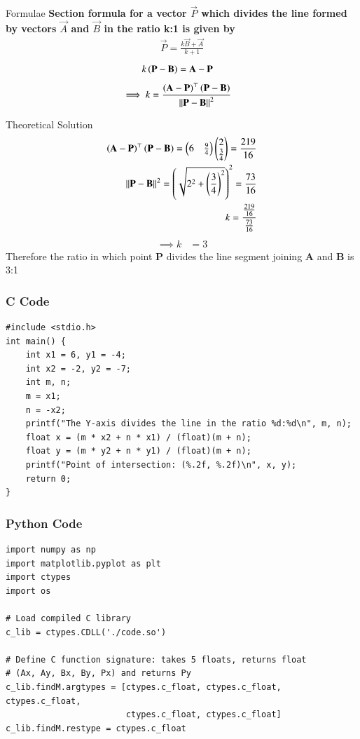 \documentclass{beamer}
\begin{document}
 \begin{frame}{Formulae}
\textbf{Section formula for a vector $\vec{P}$ which divides the line formed by vectors $\vec{A}$ and $\vec{B}$ in the ratio k:1 is given by}
\begin{align}
    \vec{P}=\frac{k\vec{B}+\vec{A}}{k+1}
\end{align}
\begin{align}
			k\left(\mathbf{P}-\mathbf{B}\right)&= \mathbf{A}-\mathbf{P}
\end{align}
\begin{align}\implies k &=
			\frac{\left(\mathbf{A}-\mathbf{P}\right)^{\top}\left(\mathbf{P}-\mathbf{B}\right)}{\left\lVert\mathbf{P}-\mathbf{B}\right\rVert^2}
			\label{eq:section_formula-k}
\end{align}
\end{frame}

\begin{frame}{Theoretical Solution}
\begin{align}
\left(\mathbf{A}-\mathbf{P}\right)^{\top}\left(\mathbf{P}-\mathbf{B}\right) =\begin{pmatrix}6 & \frac{9}{4}\end{pmatrix}\begin{pmatrix}2\\ \frac{3}{4}
\end{pmatrix}=\frac{219}{16}\\
{\left\lVert\mathbf{P}-\mathbf{B}\right\rVert^2} = \left(\sqrt{2^2 + {\left(\frac{3}{4}\right)}^2}\right)^2 = \frac{73}{16}\\
k=\frac{\frac{219}{16}}{\frac{73}{16}}
\end{align}
 \begin{align}
\implies k &= 3
\end{align}
 Therefore the ratio in which point \textbf{P} divides the line segment joining \textbf{A} and \textbf{B} is 3:1
\end{frame}

\begin{frame}[fragile]
    \frametitle{C Code }

    \begin{lstlisting}
#include <stdio.h>
int main() { 
    int x1 = 6, y1 = -4;
    int x2 = -2, y2 = -7;
    int m, n;  
    m = x1;      
    n = -x2;     
    printf("The Y-axis divides the line in the ratio %d:%d\n", m, n);
    float x = (m * x2 + n * x1) / (float)(m + n);
    float y = (m * y2 + n * y1) / (float)(m + n);
    printf("Point of intersection: (%.2f, %.2f)\n", x, y);
    return 0;
}
\end{lstlisting}
\end{frame}

\begin{frame}[fragile]
    \frametitle{Python Code}
    \begin{lstlisting}
import numpy as np
import matplotlib.pyplot as plt
import ctypes
import os

# Load compiled C library
c_lib = ctypes.CDLL('./code.so')

# Define C function signature: takes 5 floats, returns float
# (Ax, Ay, Bx, By, Px) and returns Py
c_lib.findM.argtypes = [ctypes.c_float, ctypes.c_float, ctypes.c_float,
                        ctypes.c_float, ctypes.c_float]
c_lib.findM.restype = ctypes.c_float
  \end{lstlisting}
\end{frame}
\end{document}
